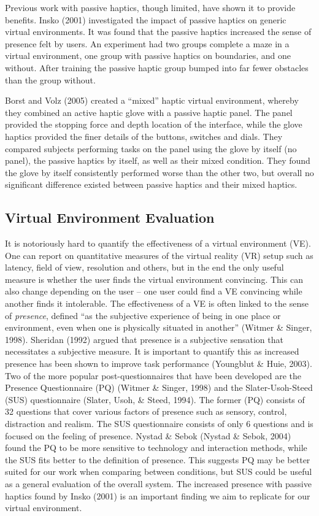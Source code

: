 Previous work with passive haptics, though limited, have shown it to provide benefits.
Insko (2001) investigated the impact of passive haptics on generic virtual environments.
It was found that the passive haptics increased the sense of presence felt by users.
An experiment had two groups complete a maze in a virtual environment, one group with passive haptics on boundaries, and one without.
After training the passive haptic group bumped into far fewer obstacles than the group without.

Borst and Volz (2005) created a ``mixed'' haptic virtual environment, whereby they combined an active haptic glove with a passive haptic panel.
The panel provided the stopping force and depth location of the interface, while the glove haptics provided the finer details of the buttons, switches and dials.
They compared subjects performing tasks on the panel using the glove by itself (no panel), the passive haptics by itself, as well as their mixed condition.
They found the glove by itself consistently performed worse than the other two, but overall no significant difference existed between passive haptics and their mixed haptics.

\subsection{Virtual Environment Evaluation}
\label{virtual-environment-evaluation}

It is notoriously hard to quantify the effectiveness of a virtual environment (VE).
One can report on quantitative measures of the virtual reality (VR) setup such as latency, field of view, resolution and others, but in the end the only useful measure is whether the user finds the virtual environment convincing.
This can also change depending on the user -- one user could find a VE convincing while another finds it intolerable.
The effectiveness of a VE is often linked to the sense of \emph{presence}, defined ``as the subjective experience of being in one place or environment, even when one is physically situated in another'' (Witmer \& Singer, 1998).
Sheridan (1992) argued that presence is a subjective sensation that necessitates a subjective measure.
It is important to quantify this as increased presence has been shown to improve task performance (Youngblut \& Huie, 2003).
Two of the more popular post-questionnaires that have been developed are the Presence Questionnaire (PQ) (Witmer \& Singer, 1998) and the Slater-Usoh-Steed (SUS) questionnaire (Slater, Usoh, \& Steed, 1994).
The former (PQ) consists of 32 questions that cover various factors of presence such as sensory, control, distraction and realism.
The SUS questionnaire consists of only 6 questions and is focused on the feeling of presence.
 Nystad \& Sebok (Nystad \& Sebok, 2004) found the PQ to be more sensitive to technology and interaction methods, while the SUS fits better to the definition of presence.
This suggests PQ may be better suited for our work when comparing between conditions, but SUS could be useful as a general evaluation of the overall system.
The increased presence with passive haptics found by Insko (2001) is an important finding we aim to replicate for our virtual environment.

